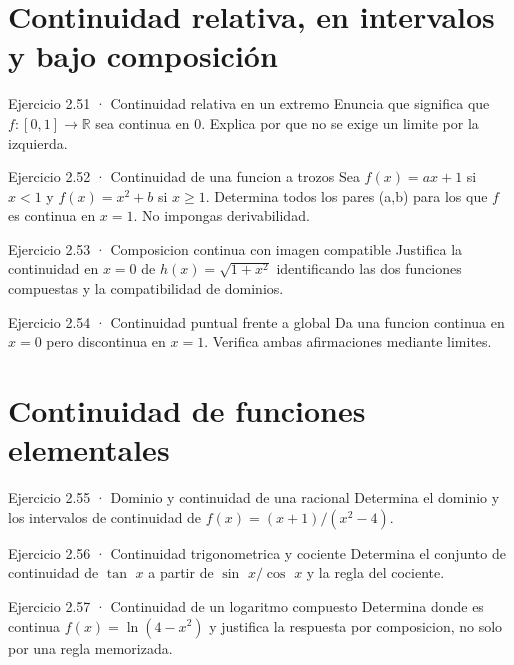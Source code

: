 \documentclass[10pt,a4paper,oneside,openany]{book}
\begin{document}
\section{Continuidad relativa, en intervalos y bajo composición}
\begin{PSevenExerciseFixed}{Ejercicio 2.51 · Continuidad relativa en un extremo}
Enuncia que significa que \(f:[0,1]\to \mathbb{R}\) sea continua en \(0\). Explica por que no se exige un limite por la izquierda.
\end{PSevenExerciseFixed}
\begin{PSevenExerciseFixed}{Ejercicio 2.52 · Continuidad de una funcion a trozos}
Sea \(f(x)=ax+1\) si \(x<1\) y \(f(x)=x^{2}+b\) si \(x\ge 1\). Determina todos los pares (a,b) para los que \(f\) es continua en \(x=1\). No impongas derivabilidad.
\end{PSevenExerciseFixed}
\begin{PSevenExerciseFixed}{Ejercicio 2.53 · Composicion continua con imagen compatible}
Justifica la continuidad en \(x=0\) de \(h(x)=\sqrt{1+x^{2}}\) identificando las dos funciones compuestas y la compatibilidad de dominios.
\end{PSevenExerciseFixed}
\begin{PSevenExerciseFixed}{Ejercicio 2.54 · Continuidad puntual frente a global}
Da una funcion continua en \(x=0\) pero discontinua en \(x=1\). Verifica ambas afirmaciones mediante limites.
\end{PSevenExerciseFixed}
\section{Continuidad de funciones elementales}
\begin{PSevenExerciseFixed}{Ejercicio 2.55 · Dominio y continuidad de una racional}
Determina el dominio y los intervalos de continuidad de \(f(x)=(x+1)/(x^{2}-4)\).
\end{PSevenExerciseFixed}
\begin{PSevenExerciseFixed}{Ejercicio 2.56 · Continuidad trigonometrica y cociente}
Determina el conjunto de continuidad de \(\tan\) \(x\) a partir de \(\sin\) \(x/\cos\) \(x\) y la regla del cociente.
\end{PSevenExerciseFixed}
\begin{PSevenExerciseFixed}{Ejercicio 2.57 · Continuidad de un logaritmo compuesto}
Determina donde es continua \(f(x)=\ln(4-x^{2})\) y justifica la respuesta por composicion, no solo por una regla memorizada.
\end{PSevenExerciseFixed}
\end{document}
